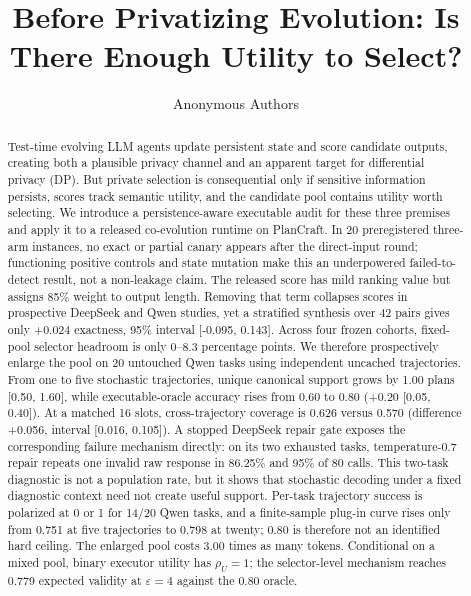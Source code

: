 \documentclass{article}
\title{Before Privatizing Evolution: Is There Enough Utility to Select?}
\author{Anonymous Authors}
\begin{document}
\maketitle

\begin{abstract}
Test-time evolving LLM agents update persistent state and score candidate outputs, creating both a plausible privacy channel and an apparent target for differential privacy (DP). But private selection is consequential only if sensitive information persists, scores track semantic utility, and the candidate pool contains utility worth selecting. We introduce a persistence-aware executable audit for these three premises and apply it to a released co-evolution runtime on PlanCraft. In 20 preregistered three-arm instances, no exact or partial canary appears after the direct-input round; functioning positive controls and state mutation make this an underpowered failed-to-detect result, not a non-leakage claim. The released score has mild ranking value but assigns 85\% weight to output length. Removing that term collapses scores in prospective DeepSeek and Qwen studies, yet a stratified synthesis over 42 pairs gives only +0.024 exactness, 95\% interval [-0.095, 0.143]. Across four frozen cohorts, fixed-pool selector headroom is only 0--8.3 percentage points. We therefore prospectively enlarge the pool on 20 untouched Qwen tasks using independent uncached trajectories. From one to five stochastic trajectories, unique canonical support grows by 1.00 plans [0.50, 1.60], while executable-oracle accuracy rises from 0.60 to 0.80 (+0.20 [0.05, 0.40]). At a matched 16 slots, cross-trajectory coverage is 0.626 versus 0.570 (difference +0.056, interval [0.016, 0.105]). A stopped DeepSeek repair gate exposes the corresponding failure mechanism directly: on its two exhausted tasks, temperature-0.7 repair repeats one invalid raw response in 86.25\% and 95\% of 80 calls. This two-task diagnostic is not a population rate, but it shows that stochastic decoding under a fixed diagnostic context need not create useful support. Per-task trajectory success is polarized at 0 or 1 for 14/20 Qwen tasks, and a finite-sample plug-in curve rises only from 0.751 at five trajectories to 0.798 at twenty; 0.80 is therefore not an identified hard ceiling. The enlarged pool costs 3.00 times as many tokens. Conditional on a mixed pool, binary executor utility has \(\rho_U=1\); the selector-level mechanism reaches 0.779 expected validity at \(\varepsilon=4\) against the 0.80 oracle.
\end{abstract}
\end{document}
